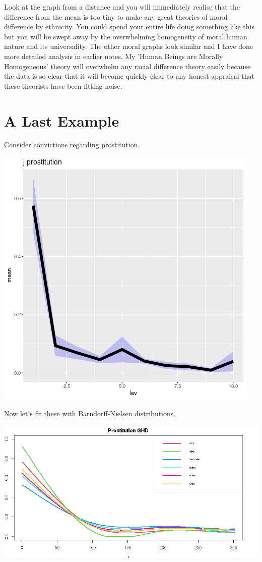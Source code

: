 \documentclass{amsart}
\begin{document}
Look at the graph from a distance and you will immediately realise that the difference from the mean is too tiny to make any great theories of moral difference by ethnicity.  You could spend your entire life doing something like this but you will be swept away by the overwhelming homogeneity of moral human nature and its universality.  The other moral graphs look similar and I have done more detailed analysis in earlier notes.  My 'Human Beings are Morally Homogeneous' theory will overwhelm any racial difference theory easily because the data is so clear that it will become quickly clear to any honest appraisal that these theorists have been fitting noise.

\section{A Last Example}

Consider convictions regarding prostitution.

\includegraphics[scale=0.5]{jprost.png}

Now let's fit these with Barndorff-Nielsen distributions.

\includegraphics[scale=0.5]{jprost_ghd.png}
\end{document}
